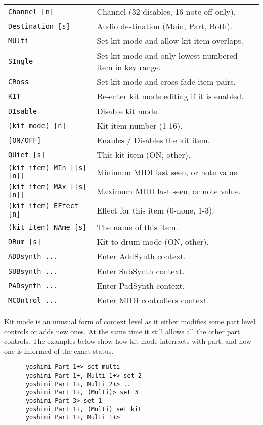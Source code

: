 \begin{table}[H]
\begin{tabular}{l l}
\texttt{Channel [n]} &
   Channel (32 disables, 16 note off only).   \\
\texttt{Destination [s]} &
   Audio destination (Main, Part, Both).  \\
\texttt{MUlti} &
   Set kit mode and allow kit item overlaps. \\
\texttt{SIngle} &
   Set kit mode and only lowest numbered item in key range. \\
\texttt{CRoss} &
   Set kit mode and cross fade item pairs. \\
\texttt{KIT} &
   Re-enter kit mode editing if it is enabled. \\
\texttt{DIsable} &
   Disable kit mode. \\
   \texttt{(kit mode) [n]} &
      Kit item number (1-16). \\
   \texttt{[ON/OFF]} &
      Enables / Disables the kit item. \\
   \texttt{QUiet [s]} &
      This kit item (ON, {other}). \\
   \texttt{(kit item) MIn [[s][n]]} &
      Minimum MIDI last seen, or note value   \\
   \texttt{(kit item) MAx [[s][n]]} &
      Maximum MIDI last seen, or note value.   \\
   \texttt{(kit item) EFfect [n]} &
      Effect for this item (0-none, 1-3). \\
   \texttt{(kit item) NAme [s]} &
      The name of this item. \\
    \texttt{DRum [s]} &
      Kit to drum mode (ON, {other}). \\
\texttt{ADDsynth ...} &
   Enter AddSynth context. \\
\texttt{SUBsynth ...} &
   Enter SubSynth context. \\
\texttt{PADsynth ...} &
   Enter PadSynth context. \\
\texttt{MCOntrol ...} &
   Enter MIDI controllers context. \\
      \end{tabular}
   \end{table}

   Kit mode is an unusual form of context level as it either modifies some
   part level controls or adds new ones. At the same time it still allows
   all the other part controls. The examples below show how kit mode
   interracts with part, and how one is informed of the exact status.

   \begin{verbatim}
      yoshimi Part 1+> set multi
      yoshimi Part 1+, Multi 1+> set 2
      yoshimi Part 1+, Multi 2+> ..
      yoshimi Part 1+, (Multi)> set 3
      yoshimi Part 3> set 1
      yoshimi Part 1+, (Multi) set kit
      yoshimi Part 1+, Multi 1+>
   \end{verbatim}

